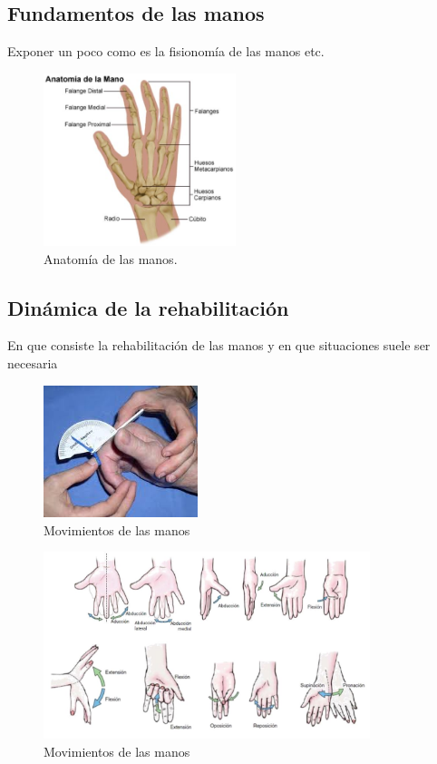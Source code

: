 \subsection{Fundamentos de las manos}
\label{sec:manos2}
Exponer un poco como es la fisionomía de las manos etc.


\begin{figure}[H]
	\centering
	\includegraphics[width=0.5\textwidth]{./img/anatomiaMano}
	\caption{Anatomía de las manos.  \cite{imgAnatomiaMano}}
		\label{fig:anatomiaMano}
	\end{figure} 


\subsection{Dinámica de la rehabilitación}
\label{sec:dinamica2}
En que consiste la rehabilitación de las manos y en que situaciones suele ser necesaria\\
\begin{figure}[H]
	\centering
	\includegraphics[width=0.4\textwidth]{./img/rehabAnti}
	\caption{Movimientos de las manos } 
	\label{fig:medidaAnticuada}
\end{figure} 

\begin{figure}[H]
	\centering
	\includegraphics[width=0.85\textwidth]{./img/ejerciciosRehManp}
	\caption{Movimientos de las manos \cite{movimientoMano}} 
	\label{fig:movManos}
\end{figure} 

